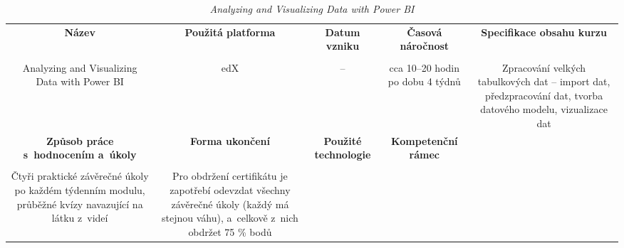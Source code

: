 \begin{landscape}

\begin{table}[htbp]

\renewcommand\thetable{5}

\caption{\textit{Analyzing and Visualizing Data with Power BI}}\label{tab5}

\footnotesize

{

\justifying

\begin{tabularx}{\linewidth}{CCCCC}

\toprule

\textbf{Název} &

\textbf{Použitá platforma} &

\textbf{Datum vzniku} &

\textbf{Časová náročnost} &
 
\textbf{Specifikace obsahu kurzu}

\\

\tabularnewline
\midrule

Analyzing and Visualizing Data with Power BI

&

edX

&

–

&

cca 10–20 hodin po dobu 4 týdnů

&

Zpracování velkých tabulkových dat – import dat, předzpracování dat, tvorba datového modelu, vizualizace dat

\\
\toprule

\textbf{Způsob práce s~hodnocením a~úkoly} &

\textbf{Forma ukončení} &

\textbf{Použité technologie} &

\textbf{Kompetenční rámec} 

\\

\tabularnewline
\midrule

Čtyři praktické závěrečné úkoly po každém týdenním modulu, průběžné kvízy navazující na látku z~videí 

&

Pro obdržení certifikátu je zapotřebí odevzdat všechny závěrečné úkoly (každý má stejnou váhu), a~celkově z~nich obdržet 75 \% bodů


\end{tabularx}}
\end{table}
\end{landscape}
